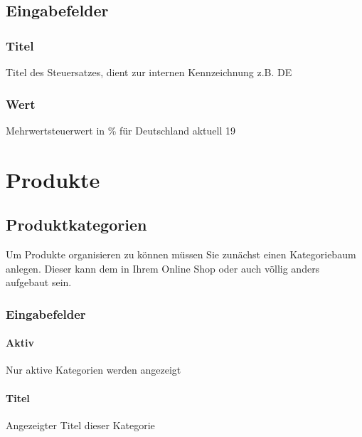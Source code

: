\documentclass[letterpaper,10pt,ngerman]{sphinxmanual}
\begin{document}
\subsection{Eingabefelder}
\label{\detokenize{hbe/taxes:eingabefelder}}

\subsubsection{Titel}
\label{\detokenize{hbe/taxes:titel}}
Titel des Steuersatzes, dient zur internen Kennzeichnung z.B. DE


\subsubsection{Wert}
\label{\detokenize{hbe/taxes:wert}}
Mehrwertsteuerwert in \% \sphinxhyphen{} für Deutschland aktuell 19


\section{Produkte}
\label{\detokenize{hbe/products/index:produkte}}\label{\detokenize{hbe/products/index::doc}}

\subsection{Produktkategorien}
\label{\detokenize{hbe/products/categories:produktkategorien}}\label{\detokenize{hbe/products/categories::doc}}
Um Produkte organisieren zu können müssen Sie zunächst einen Kategoriebaum anlegen. Dieser kann dem in Ihrem
Online Shop oder auch völlig anders aufgebaut sein.


\subsubsection{Eingabefelder}
\label{\detokenize{hbe/products/categories:eingabefelder}}

\paragraph{Aktiv}
\label{\detokenize{hbe/products/categories:aktiv}}
Nur aktive Kategorien werden angezeigt


\paragraph{Titel}
\label{\detokenize{hbe/products/categories:titel}}
Angezeigter Titel dieser Kategorie
\end{document}
